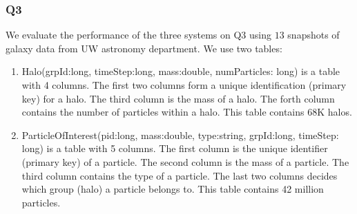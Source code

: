 \subsubsection{Q3}

We evaluate the performance of the three systems on Q3 using $13$ snapshots of 
galaxy data from UW astronomy department. We use two tables:

\begin{enumerate}
    \item Halo(grpId:long, timeStep:long, mass:double, numParticles: long) is 
    a table with 4 columns. The first two columns form a unique identification 
    (primary key) for a halo. The third column is the mass of a halo. The
    forth column contains the number of particles within a halo. This table 
    contains 68K halos.
    \item ParticleOfInterest(pid:long, mass:double, type:string, grpId:long, 
     timeStep: long) is a table with 5 columns. The first column is the unique
     identifier (primary key) of a particle. The second column is the mass of a
     particle. The third column contains the type of a particle. The last two 
     columns decides which group (halo) a particle belongs to. This table
     contains 42 million particles.
\end{enumerate}


